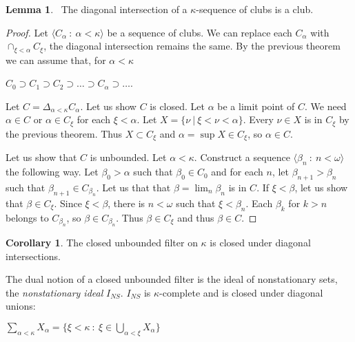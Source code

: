 \documentclass[8pt]{article}
\theoremstyle{definition}
\theoremstyle{definition}
\theoremstyle{definition}
\theoremstyle{definition}
\theoremstyle{definition}
\theoremstyle{definition}
\theoremstyle{definition}
\theoremstyle{definition}
\newtheorem{lemma}{Lemma}[section]
\theoremstyle{definition}
\theoremstyle{definition}
\theoremstyle{definition}
\theoremstyle{definition}
\theoremstyle{definition}
\theoremstyle{definition}
\newtheorem{col}{Corollary}[section]
\theoremstyle{question}
\begin{document}
\begin{lemma}~\label{diag:lemma}
  The diagonal intersection of a $\kappa$-sequence of clubs is a club.
\end{lemma}

\begin{proof}
  Let $\langle C_{\alpha} \: : \: \alpha < \kappa \rangle$ be a sequence of clubs.
  We can replace each $C_{\alpha}$ with $\cap_{\xi < \alpha} C_{\xi}$, the diagonal intersection
  remains the same. By the previous theorem we can assume that, for $\alpha < \kappa$
  \begin{center}
    $C_0 \supset C_1 \supset C_2 \supset \ldots \supset C_{\alpha} \supset \dots$.
  \end{center}

  Let $C = \Delta_{\alpha < \kappa} C_{\alpha}$. Let us show $C$ is closed.
  Let $\alpha$ be a limit point of $C$. We need $\alpha \in C$ or $\alpha \in C_{\xi}$ for each $\xi < \alpha$.
  Let $X = \{ \nu \: | \: \xi < \nu < \alpha \}$. Every $\nu \in X$ is in $C_{\xi}$ by the previous theorem.
  Thus $X \subset C_{\xi}$ and $\alpha = \sup X \in C_{\xi}$, so $\alpha \in C$.

  Let us show that $C$ is unbounded. Let $\alpha < \kappa$. Construct a sequence 
  $\langle \beta_n \: : \: n < \omega \rangle$ the following way. Let $\beta_0 > \alpha$
  such that $\beta_0 \in C_0$ and for each $n$, let $\beta_{n + 1} > \beta_n$
  such that $\beta_{n + 1} \in C_{\beta_n}$. Let us that that $\beta = \lim_{n} \beta_n$ is in $C$.
  If $\xi < \beta$, let us show that $\beta \in C_{\xi}$. Since $\xi < \beta$, there is $n < \omega$
  such that $\xi < \beta_n$. Each $\beta_k$ for $k > n$ belongs to $C_{\beta_n}$, so $\beta \in C_{\beta_n}$.
  Thus $\beta \in C_{\xi}$ and thus $\beta \in C$.
\end{proof}

\begin{col}
  The closed unbounded filter on $\kappa$ is closed under diagonal intersections.
\end{col}

The dual notion of a closed unbounded filter is the ideal of nonstationary sets, the \emph{nonstationary ideal} $I_{NS}$.
$I_{NS}$ is $\kappa$-complete and is closed under diagonal unions:
\begin{center}
  $\sum \limits_{\alpha < \kappa} X_{\alpha} = \{ \xi < \kappa \: : \: \xi \in \bigcup \limits_{\alpha < \xi} X_{\alpha} \}$
\end{center}
\end{document}
